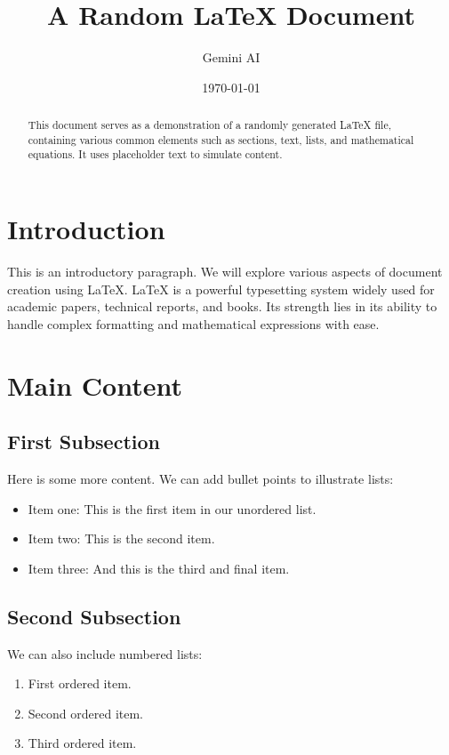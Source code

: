 \documentclass{article}
\title{A Random LaTeX Document}
\author{Gemini AI}
\date{\today}
\begin{document}
\maketitle

\begin{abstract}
This document serves as a demonstration of a randomly generated LaTeX file, containing various common elements such as sections, text, lists, and mathematical equations. It uses placeholder text to simulate content.
\end{abstract}

\section{Introduction}
\lipsum[1] %

This is an introductory paragraph. We will explore various aspects of document creation using LaTeX. LaTeX is a powerful typesetting system widely used for academic papers, technical reports, and books. Its strength lies in its ability to handle complex formatting and mathematical expressions with ease.

\section{Main Content}
\subsection{First Subsection}
\lipsum[2] %

Here is some more content. We can add bullet points to illustrate lists:
\begin{itemize}
    \item Item one: This is the first item in our unordered list.
    \item Item two: This is the second item.
    \item Item three: And this is the third and final item.
\end{itemize}

\subsection{Second Subsection}
\lipsum[3] %

We can also include numbered lists:
\begin{enumerate}
    \item First ordered item.
    \item Second ordered item.
    \item Third ordered item.
\end{enumerate}
\end{document}
